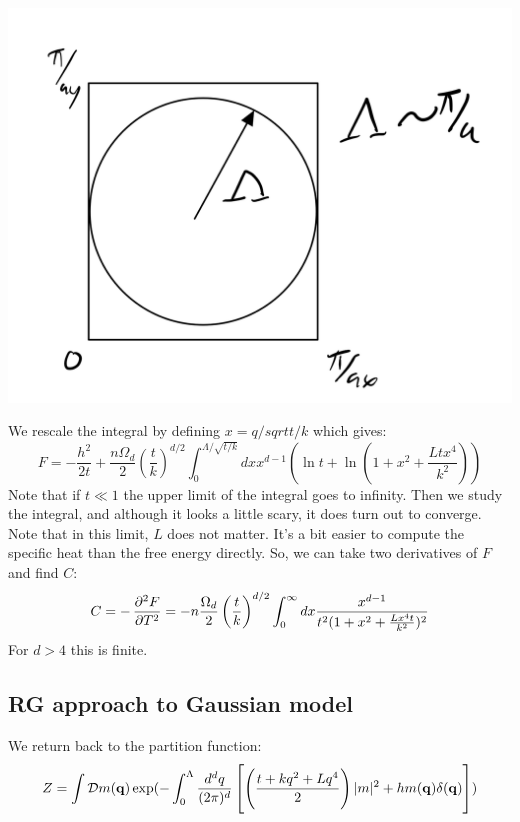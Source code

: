 \begin{center}
    \includegraphics[scale=0.3]{Lectures/Figures/lec8-hypersphere.png}
\end{center}

We rescale the integral by defining $x = q/sqrt{t/k}$ which gives:
\begin{equation}
    F = -\frac{h^2}{2t} + \frac{n\Omega_d}{2}\left(\frac{t}{k}\right)^{d/2}\int_0^{\Lambda/\sqrt{t/k}} dx x^{d-1}\left(\ln t + \ln(1 + x^2 + \frac{Ltx^4}{k^2})\right)
\end{equation}
Note that if $t \ll 1$ the upper limit of the integral goes to infinity. Then we study the integral, and although it looks a little scary, it does turn out to converge. Note that in this limit, $L$ does not matter. It's a bit easier to compute the specific heat than the free energy directly. So, we can take two derivatives of $F$ and find $C$:
\begin{equation}
    C = -\dpd[2]{F}{T} = -n\frac{\Omega_d}{2}\left(\frac{t}{k}\right)^{d/2} \int_0^\infty dx \frac{x^{d-1}}{t^2(1 + x^2 + \frac{Lx^4t}{k^2})^2}
\end{equation} 
For $d > 4$ this is finite.

\subsection{RG approach to Gaussian model}
We return back to the partition function:
\begin{equation}
    Z = \int \mathcal{D}m(\mathbf{q})\exp(-\int_0^\Lambda \frac{d^dq}{(2\pi)^d}\left[\left(\frac{t + kq^2 + Lq^4}{2}\right)\lvert m \rvert^2 + hm(\mathbf{q})\delta(\mathbf{q})\right])
\end{equation}
